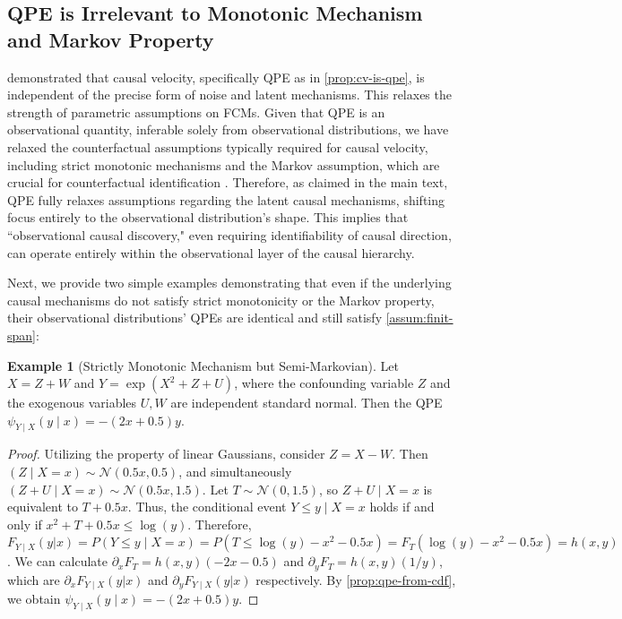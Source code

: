 \documentclass{article}
\theoremstyle{plain}
\theoremstyle{definition}
\newtheorem{example}[theorem]{Example}
\theoremstyle{remark}
\begin{document}
\subsection{QPE is Irrelevant to Monotonic Mechanism and Markov Property}
\label{app:a_example}

\citep{Xi2025} demonstrated that causal velocity, specifically QPE as in \cref{prop:cv-is-qpe}, is independent of the precise form of noise and latent mechanisms. This relaxes the strength of parametric assumptions on FCMs. Given that QPE is an observational quantity, inferable solely from observational distributions, we have relaxed the counterfactual assumptions typically required for causal velocity, including strict monotonic mechanisms and the Markov assumption, which are crucial for counterfactual identification \citep{Nasr-Esfahany2023,Chen2025}. Therefore, as claimed in the main text, QPE fully relaxes assumptions regarding the latent causal mechanisms, shifting focus entirely to the observational distribution's shape. This implies that ``observational causal discovery," even requiring identifiability of causal direction, can operate entirely within the observational layer of the causal hierarchy.

Next, we provide two simple examples demonstrating that even if the underlying causal mechanisms do not satisfy strict monotonicity or the Markov property, their observational distributions' QPEs are identical and still satisfy \cref{assum:finit-span}:

\begin{example}[Strictly Monotonic Mechanism but Semi-Markovian]
\label{ep:mono-semi-markovian}
Let $X=Z+W$ and $Y=\exp(X^2+Z+U)$, where the confounding variable $Z$ and the exogenous variables $U,W$ are independent standard normal. Then the QPE $\psi_{Y\mid X}(y\!\mid\!x)=-(2x+0.5)y$.
\end{example}
\begin{proof}
Utilizing the property of linear Gaussians, consider $Z=X-W$. Then $(Z\!\mid\!X=x)\sim\mathcal{N}(0.5x,0.5)$, and simultaneously $(Z+U\!\mid\!X=x)\sim\mathcal{N}(0.5x,1.5)$. Let $T\sim\mathcal{N}(0,1.5)$, so $Z+U\!\mid\!X=x$ is equivalent to $T+0.5x$. Thus, the conditional event $Y\le y\mid X=x$ holds if and only if $x^2+T+0.5x\le\log(y)$. Therefore, $F_{Y\mid X}(y|x)=P(Y\le y\mid X=x)=P(T\le\log(y)-x^2-0.5x)=F_T(\log(y)-x^2-0.5x)=h(x,y)$. We can calculate $\partial_x F_T=h(x,y)(-2x-0.5)$ and $\partial_y F_T=h(x,y)(1/y)$, which are $\partial_xF_{Y\mid X}(y|x)$ and $\partial_yF_{Y\mid X}(y|x)$ respectively. By \cref{prop:qpe-from-cdf}, we obtain $\psi_{Y\mid X}(y\!\mid\!x)=-(2x+0.5)y$.
\end{proof}
\end{document}
